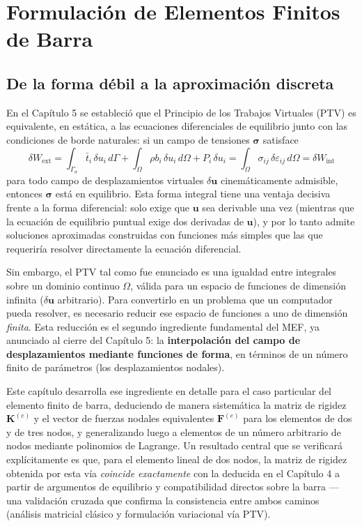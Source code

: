 \chapter{Formulación de Elementos Finitos de Barra}
\label{chap:cap06-formulacion-fem-barras}

\section{De la forma débil a la aproximación discreta}

En el Capítulo 5 se estableció que el Principio de los Trabajos Virtuales (PTV) es equivalente, en estática, a las ecuaciones diferenciales de equilibrio junto con las condiciones de borde naturales: si un campo de tensiones $\bm\sigma$ satisface
\[
\delta W_{\text{ext}} = \int_{\Gamma_\sigma} \bar t_i\,\delta u_i \, d\Gamma + \int_\Omega \rho b_i \,\delta u_i \, d\Omega + P_i\,\delta u_i
= \int_\Omega \sigma_{ij}\,\delta\varepsilon_{ij}\, d\Omega = \delta W_{\text{int}}
\]
para todo campo de desplazamientos virtuales $\delta\bm u$ cinemáticamente admisible, entonces $\bm\sigma$ está en equilibrio. Esta forma integral tiene una ventaja decisiva frente a la forma diferencial: solo exige que $\bm u$ sea derivable una vez (mientras que la ecuación de equilibrio puntual exige dos derivadas de $\bm u$), y por lo tanto admite soluciones aproximadas construidas con funciones más simples que las que requeriría resolver directamente la ecuación diferencial.

Sin embargo, el PTV tal como fue enunciado es una igualdad entre integrales sobre un dominio continuo $\Omega$, válida para un espacio de funciones de dimensión infinita ($\delta\bm u$ arbitrario). Para convertirlo en un problema que un computador pueda resolver, es necesario reducir ese espacio de funciones a uno de dimensión \emph{finita}. Esta reducción es el segundo ingrediente fundamental del MEF, ya anunciado al cierre del Capítulo 5: la \textbf{interpolación del campo de desplazamientos mediante funciones de forma}, en términos de un número finito de parámetros (los desplazamientos nodales).

Este capítulo desarrolla ese ingrediente en detalle para el caso particular del elemento finito de barra, deduciendo de manera sistemática la matriz de rigidez $\bm K^{(e)}$ y el vector de fuerzas nodales equivalentes $\bm F^{(e)}$ para los elementos de dos y de tres nodos, y generalizando luego a elementos de un número arbitrario de nodos mediante polinomios de Lagrange. Un resultado central que se verificará explícitamente es que, para el elemento lineal de dos nodos, la matriz de rigidez obtenida por esta vía \emph{coincide exactamente} con la deducida en el Capítulo 4 a partir de argumentos de equilibrio y compatibilidad directos sobre la barra --- una validación cruzada que confirma la consistencia entre ambos caminos (análisis matricial clásico y formulación variacional vía PTV).

